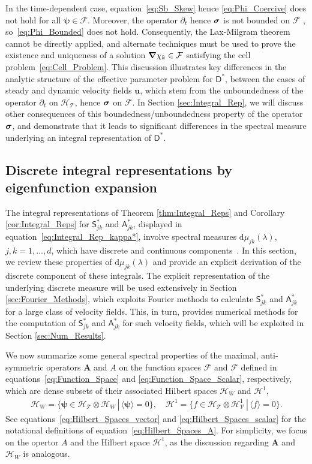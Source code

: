\documentclass[leqno,onefignum,onetabnum]{siamltex1213}
\renewcommand{\d}{\mathrm{d}}
\newcommand{\Ab}{\mathbf{A}}
\newcommand{\Tc}{\mathcal{T}}
\newcommand{\Vc}{\mathcal{V}}
\newcommand{\Hc}{\mathcal{H}}
\newcommand{\Fc}{\mathcal{F}}
\newcommand{\Dm}{\mathsf{D}}
\newcommand{\Sm}{\mathsf{S}}
\newcommand{\Am}{\mathsf{A}}
\newcommand{\Hs}{\mathscr{H}}
\newcommand{\Fs}{\mathscr{F}}
\newcommand\bsig{\mbox{\boldmath${\sigma}$}}
\newcommand\bnabla{\mbox{\boldmath${\nabla}$}}
\newcommand{\vecu}{\boldsymbol{u}}
\newcommand{\vecpsi}{\boldsymbol{\psi}}
\begin{document}
In the time-dependent case, equation~\eqref{eq:Sb_Skew} hence
\eqref{eq:Phi_Coercive} does not hold for all $\vecpsi\in\Fc$. Moreover, 
the operator $\partial_t$ hence $\bsig$ is not bounded on $\Fc$
\cite{Reed-1980,Stakgold:BVP:2000}, so~\eqref{eq:Phi_Bounded} does not
hold. Consequently, the Lax-Milgram theorem cannot be directly
applied, and alternate techniques  
\cite{Friedman:1969:PDE,Friedman:1969:PDE:Parabolic} must be used to
prove the existence and uniqueness of a solution $\bnabla \chi_k\in\Fc$ 
satisfying the cell problem~\eqref{eq:Cell_Problem}. This discussion
illustrates key differences in the analytic structure of the effective
parameter problem for $\Dm^*$, between the cases of steady and
dynamic velocity fields $\vecu $, which stem from the unboundedness
of the operator $\partial_t$ on $\Hc_{\Tc}$, hence $\bsig$ on $\Fc$. In Section
\ref{sec:Integral_Rep}, we will discuss other consequences of this
boundedness/unboundedness property of the operator $\bsig$, and
demonstrate that it leads to significant differences in the spectral
measure underlying an  integral representation of $\Dm^*$.     


\subsection{Discrete integral representations by eigenfunction
  expansion}\label{sec:Eig_Funct_Exp} 
%
The integral representations of Theorem \ref{thm:Integral_Reps} and
Corollary \ref{cor:Integral_Reps} for $\Sm^*_{jk}$ and $\Am^*_{jk}$,
displayed in equation~\eqref{eq:Integral_Rep_kappa*},  involve
spectral measures $\d\mu_{jk}(\lambda)$, $j,k=1,\ldots,d$, which have discrete and
continuous components~\cite{Reed-1980,Stone:64}. In this section, we
review these properties of $\d\mu_{jk}(\lambda)$ and provide an explicit
derivation of the discrete component of these integrals. The 
explicit representation of the underlying discrete measure will
be used extensively in Section \ref{sec:Fourier_Methods}, which
exploits Fourier methods to calculate $\Sm^*_{jk}$ and $\Am^*_{jk}$ for a
large class of velocity fields. This, in turn, provides numerical
methods for the computation of $\Sm^*_{jk}$ and $\Am^*_{jk}$ for such
velocity fields, which will be exploited in Section
\ref{sec:Num_Results}.   



We now summarize some general spectral properties of the maximal,
anti-symmetric operators $\Ab$ and $A$ on the function spaces $\Fc$
and $\Fs$ defined in equations~\eqref{eq:Function_Space} and
\eqref{eq:Function_Space_Scalar}, respectively, which are dense
subsets of their associated Hilbert spaces $\Hc_W$ and $\Hs^1$,  
%
\begin{align}\label{eq:Hilbert_Spaces_A}
  \Hc_W=\{\vecpsi\in \Hc_\Tc\otimes\Hc_W \,|\, \langle\vecpsi\rangle=0\},\quad
  \Hs^1=\{f\in \Hs_\Tc\otimes\Hs^1_\Vc \,|\, \langle f\rangle=0\}.
\end{align}
%
See equations~\eqref{eq:Hilbert_Spaces_vector} and
\eqref{eq:Hilbert_Spaces_scalar} for the notational definitions of
equation~\eqref{eq:Hilbert_Spaces_A}. For simplicity, we focus on the 
opertor $A$ and the Hilbert space $\Hs^1$, as the discussion regarding
$\Ab$ and $\Hc_W$ is analogous.
\end{document}

